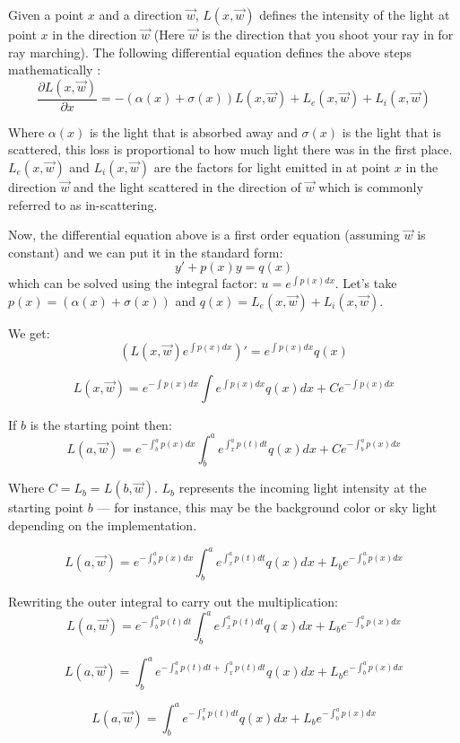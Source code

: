 Given a point $x$ and a direction $\vec{w}$, $L(x, \vec{w})$ defines the intensity of the light at point $x$ in the direction $\vec{w}$ (Here $\vec{w}$ is the direction that you shoot your ray in for ray marching). The following differential equation defines the above steps mathematically \cite{palenik2016volumetricclouds}:
\[
    \frac{\partial{L(x, \vec{w})}}{\partial{x}} = -(\alpha(x) + \sigma(x))L(x, \vec{w}) + L_e(x, \vec{w}) + L_i(x, \vec{w}) 
\]

Where $\alpha(x)$ is the light that is absorbed away and $\sigma(x)$ is the light that is scattered, this loss is proportional to how much light there was in the first place. $L_e(x, \vec{w})$ and $L_i(x, \vec{w})$ are the factors for light emitted in at point $x$ in the direction $\vec{w}$ and the light scattered in the direction of $\vec{w}$ which is commonly referred to as in-scattering.

Now, the differential equation above is a first order equation (assuming $\vec{w}$ is constant) and we can put it in the standard form: 
\[
    y' + p(x)y = q(x)
\]
which can be solved using the integral factor: $u=e^{\int{p(x)dx}}$. Let's take $p(x) = (\alpha(x) + \sigma(x))$ and $q(x) = L_e(x, \vec{w}) + L_i(x, \vec{w})$.

We get:
\[
(L(x, \vec{w})e^{\int{p(x)dx}})' = e^{\int{p(x)dx}}q(x)
\]

\[
L(x, \vec{w}) = e^{-\int{p(x)dx}}\int{e^{\int{p(x)dx}}q(x)dx} + Ce^{-\int{p(x)dx}}
\]

If $b$ is the starting point then:
\[
L(a, \vec{w}) = e^{-\int_{b}^{a}{p(x)dx}}\int_b^{a}{e^{\int_x^{a}{p(t)dt}}q(x)dx} + Ce^{-\int_b^{a}{p(x)dx}}
\]

Where $C = L_b = L(b, \vec{w})$. $L_b$ represents the incoming light intensity at the starting point $b$ — for instance, this may be the background color or sky light depending on the implementation.

\[
L(a, \vec{w}) = e^{-\int_{b}^{a}{p(x)dx}}\int_b^{a}{e^{\int_x^{a}{p(t)dt}}q(x)dx} + L_be^{-\int_b^{a}{p(x)dx}}
\]

Rewriting the outer integral to carry out the multiplication:
\[
L(a, \vec{w}) = e^{-\int_{b}^{a}{p(t)dt}}\int_b^{a}{e^{\int_x^{a}{p(t)dt}}q(x)dx} + L_be^{-\int_b^{a}{p(x)dx}}
\]

\[
L(a, \vec{w}) = \int_b^{a}{e^{-\int_{b}^{a}{p(t)dt}+\int_x^{a}{p(t)dt}}q(x)dx} + L_be^{-\int_b^{a}{p(x)dx}}
\]

\[
L(a, \vec{w}) = \int_b^{a}{e^{-\int_{b}^{x}{p(t)dt}}q(x)dx} + L_be^{-\int_b^{a}{p(x)dx}}
\]

